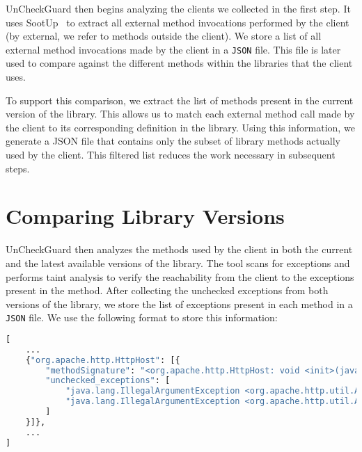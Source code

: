 
UnCheckGuard then begins analyzing the clients we collected in the first step. It uses SootUp~\cite{Karakaya24:_sootup} to extract all external method invocations performed by the client (by external, we refer to methods outside the client). We store a list of all external method invocations made by the client in a \texttt{JSON} file. This file is later used to compare against the different methods within the libraries that the client uses.

To support this comparison, we extract the list of methods present in the current version of the library. This allows us to match each external method call made by the client to its corresponding definition in the library. Using this information, we generate a JSON file that contains only the subset of library methods actually used by the client. This filtered list reduces the work necessary in subsequent steps.


\section{Comparing Library Versions}

UnCheckGuard then analyzes the methods used by the client in both the current and the latest available versions of the library. The tool scans for exceptions and performs taint analysis to verify the reachability from the client to the exceptions present in the method. After collecting the unchecked exceptions from both versions of the library, we store the list of exceptions present in each method in a \texttt{JSON} file. We use the following format to store this information:
\begin{lstlisting}[language=python]
[
    ...
    {"org.apache.http.HttpHost": [{
        "methodSignature": "<org.apache.http.HttpHost: void <init>(java.lang.String,int)>",
        "unchecked_exceptions": [
            "java.lang.IllegalArgumentException <org.apache.http.util.Args: java.lang.CharSequence containsNoBlanks(java.lang.CharSequence,java.lang.String)>",
            "java.lang.IllegalArgumentException <org.apache.http.util.Args: java.lang.CharSequence containsNoBlanks(java.lang.CharSequence,java.lang.String)>"
        ]
    }]},
    ...
]
\end{lstlisting}

